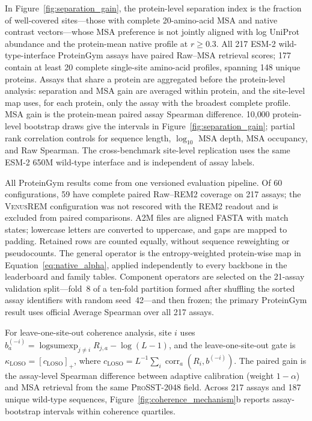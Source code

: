 \documentclass{article} %
\begin{document}
In Figure~\ref{fig:separation_gain}, the protein-level separation index is the fraction of well-covered sites---those with complete 20-amino-acid MSA and native contrast vectors---whose MSA preference is not jointly aligned with log UniProt abundance and the protein-mean native profile at $r\geq0.3$. All 217 \textsc{ESM-2} wild-type-interface ProteinGym assays have paired Raw--MSA retrieval scores; 177 contain at least 20 complete single-site amino-acid profiles, spanning 148 unique proteins. Assays that share a protein are aggregated before the protein-level analysis: separation and MSA gain are averaged within protein, and the site-level map uses, for each protein, only the assay with the broadest complete profile. MSA gain is the protein-mean paired assay Spearman difference. 10{,}000 protein-level bootstrap draws give the intervals in Figure~\ref{fig:separation_gain}; partial rank correlation controls for sequence length, $\log_{10}$ MSA depth, MSA occupancy, and Raw Spearman. The cross-benchmark site-level replication uses the same \textsc{ESM-2} 650M wild-type interface and is independent of assay labels.

All ProteinGym results come from one versioned evaluation pipeline. Of 60 configurations, 59 have complete paired Raw--\textsc{REM2} coverage on 217 assays; the \textsc{VenusREM} configuration was not rescored with the \textsc{REM2} readout and is excluded from paired comparisons. A2M files are aligned FASTA with match states; lowercase letters are converted to uppercase, and gaps are mapped to padding. Retained rows are counted equally, without sequence reweighting or pseudocounts. The general operator is the entropy-weighted protein-wise map in Equation~\ref{eq:native_alpha}, applied independently to every backbone in the leaderboard and family tables. Component operators are selected on the 21-assay validation split---fold~8 of a ten-fold partition formed after shuffling the sorted assay identifiers with random seed~42---and then frozen; the primary ProteinGym result uses official Average Spearman over all 217 assays.

For leave-one-site-out coherence analysis, site $i$ uses $b_a^{(-i)}=\operatorname{logsumexp}_{j\ne i}R_{j,a}-\log(L-1)$, and the leave-one-site-out gate is $\kappa_{\mathrm{LOSO}}=[c_{\mathrm{LOSO}}]_+$, where $c_{\mathrm{LOSO}}=L^{-1}\sum_i\operatorname{corr}_a(R_i,b^{(-i)})$. The paired gain is the assay-level Spearman difference between adaptive calibration (weight $1-\alpha$) and MSA retrieval from the same \textsc{ProSST-2048} field. Across 217 assays and 187 unique wild-type sequences, Figure~\ref{fig:coherence_mechanism}b reports assay-bootstrap intervals within coherence quartiles.
\end{document}
